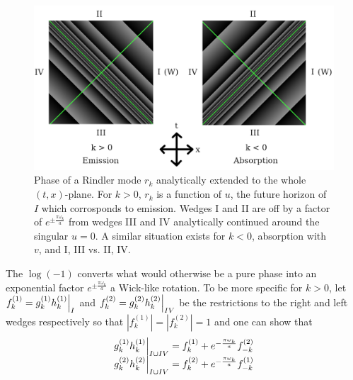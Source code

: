 \documentclass[12pt,a4paper]{article}
\newcommand\restr[2]{{%
  \left.\kern-\nulldelimiterspace %
  #1 %
  \vphantom{\big|} %
  \right|_{#2} %
  }}
\begin{document}
\begin{figure}[h]
  \centering
  \captionsetup{width=0.8\linewidth}
\includegraphics[scale=0.3]{analytic.png}
\caption{Phase of a Rindler mode $r_k$ analytically extended to the whole $(t,x)$-plane. For $k>0$, $r_k$ is a function of $u$, the future horizon of $I$ which corrosponds to emission.  Wedges I and II are off by a factor of $e^{\pm \frac{\pi \omega_k}{a}}$ from wedges III and IV analytically continued around the singular $u=0$.  A similar situation exists for $k<0$, absorption with $v$, and I, III vs. II, IV.}
\label{analytic}
\end{figure}

The $\log(-1)$ converts what would otherwise be a pure phase into an exponential factor $e^{\pm \frac{\pi \omega_k}{a}}$ a Wick-like rotation.  To be more specific for $k>0$, let $f_k^{(1)} = \restr{g_k^{(1)} h_k^{(1)}}{I}$ and $f_k^{(2)} = \restr{g_k^{(2)} h_k^{(2)}}{IV}$ be the restrictions to the right and left wedges respectively so that $\left|f_k^{(1)}\right| = \left|f_k^{(2)}\right| = 1$ and one can show that
\begin{equation}
  \begin{array}{l}
    \restr{g_k^{(1)} h_k^{(1)}}{I \cup IV} = f_k^{(1)} + e^{- \frac{\pi \omega_k}{a}} f_{-k}^{(2)} \\
    \restr{g_k^{(2)} h_k^{(2)}}{I \cup IV} = f_k^{(2)} + e^{- \frac{\pi \omega_k}{a}} f_{-k}^{(1)}
  \end{array}
\end{equation}
\end{document}
